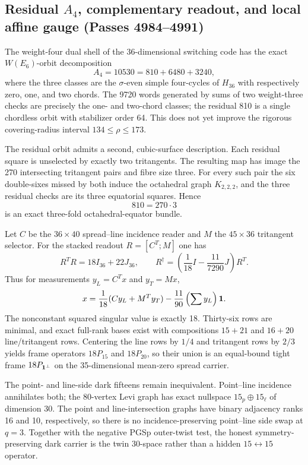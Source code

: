 \subsection*{Residual $A_4$, complementary readout, and local affine gauge (Passes 4984--4991)}
The weight-four dual shell of the 36-dimensional switching code has the exact $W(E_6)$-orbit decomposition
\[
A_4=10530=810+6480+3240,
\]
where the three classes are the $\sigma$-even simple four-cycles of $H_{36}$ with respectively zero, one, and two chords.  The 9720 words generated by sums of two weight-three checks are precisely the one- and two-chord classes; the residual 810 is a single chordless orbit with stabilizer order 64.  This does not yet improve the rigorous covering-radius interval $134\leq\rho\leq173$.

The residual orbit admits a second, cubic-surface description.  Each residual square is unselected by exactly two tritangents.  The resulting map has image the 270 intersecting tritangent pairs and fibre size three.  For every such pair the six double-sixes missed by both induce the octahedral graph $K_{2,2,2}$, and the three residual checks are its three equatorial squares.  Hence
\[
810=270\cdot3
\]
is an exact three-fold octahedral-equator bundle.

Let $C$ be the $36\times40$ spread--line incidence reader and $M$ the $45\times36$ tritangent selector.  For the stacked readout $R=[C^T;M]$ one has
\[
R^TR=18I_{36}+22J_{36},
\qquad
R^\dagger=\left(\frac1{18}I-\frac{11}{7290}J\right)R^T.
\]
Thus for measurements $y_L=C^Tx$ and $y_T=Mx$,
\[
x=\frac1{18}(Cy_L+M^Ty_T)-\frac{11}{90}\left(\sum y_L\right){\bf1}.
\]
The nonconstant squared singular value is exactly 18.  Thirty-six rows are minimal, and exact full-rank bases exist with compositions $15+21$ and $16+20$ line/tritangent rows.  Centering the line rows by $1/4$ and tritangent rows by $2/3$ yields frame operators $18P_{15}$ and $18P_{20}$, so their union is an equal-bound tight frame $18P_{{\bf1}^{\perp}}$ on the 35-dimensional mean-zero spread carrier.

The point- and line-side dark fifteens remain inequivalent.  Point--line incidence annihilates both; the 80-vertex Levi graph has exact nullspace $15_p\oplus15_\ell$ of dimension 30.  The point and line-intersection graphs have binary adjacency ranks 16 and 10, respectively, so there is no incidence-preserving point--line side swap at $q=3$.  Together with the negative PGSp outer-twist test, the honest symmetry-preserving dark carrier is the twin 30-space rather than a hidden $15\leftrightarrow15$ operator.

